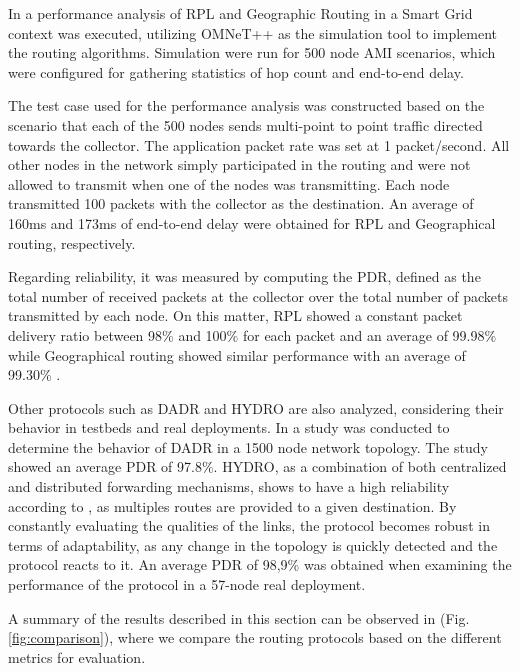 \documentclass[11pt,draftclsnofoot,onecolumn]{IEEEtran}
\begin{document}
In \cite{Iyer2011a} a performance analysis of RPL and Geographic Routing in a Smart Grid context was executed, utilizing OMNeT++ as the simulation tool to implement the routing algorithms. Simulation were run for 500 node AMI scenarios, which were configured for gathering statistics of hop count and end-to-end delay. 

The test case used for the performance analysis was constructed based on the scenario that each of the 500 nodes sends multi-point to point traffic directed towards the collector. The application packet rate was set at 1 packet/second. All other nodes in the network simply participated in the routing and were not allowed to transmit when one of the nodes was transmitting. Each node transmitted 100 packets with the collector as the destination. An average of 160ms and 173ms of end-to-end delay were obtained for RPL and Geographical routing, respectively. 

Regarding reliability, it was measured by computing the PDR, defined as the total number of received packets at the collector over the total number of packets transmitted by each node. On this matter, RPL showed a constant packet delivery ratio between 98\% and 100\% for each packet and an average of 99.98\% while Geographical routing showed similar performance with an average of 99.30\% \cite{Iyer2011a}.  

Other protocols such as DADR and HYDRO are also analyzed, considering their behavior in testbeds and real deployments. In  \cite{Iwao2010} a study was conducted to determine the behavior of DADR in a 1500 node network topology. The study showed an average PDR of 97.8\%. HYDRO, as a combination of both centralized and distributed forwarding mechanisms, shows to have a high reliability according to \cite{Dawson2010}, as multiples routes are provided to a given destination.  By constantly evaluating the qualities of the links, the protocol becomes robust in terms of adaptability, as any change in the topology is quickly detected and the protocol reacts to it. An average PDR of 98,9\% was obtained when examining the performance of the protocol in a 57-node real deployment. 
	
A summary of the results described in this section can be observed in (Fig. \ref{fig:comparison}), where we compare the routing protocols based on the different metrics for evaluation.
\end{document}
